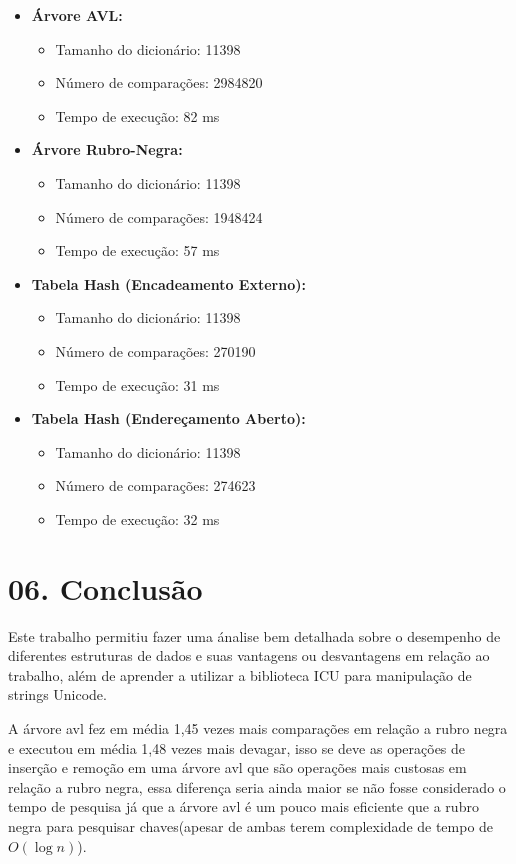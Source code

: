 \documentclass{article}
\begin{document}
\begin{itemize}
    \item \textbf{Árvore AVL:}
    \begin{itemize}
        \item Tamanho do dicionário: 11398
        \item Número de comparações: 2984820
        \item Tempo de execução: 82 ms
    \end{itemize}
    
    \item \textbf{Árvore Rubro-Negra:}
    \begin{itemize}
        \item Tamanho do dicionário: 11398
        \item Número de comparações: 1948424
        \item Tempo de execução: 57 ms
    \end{itemize}
    
    \item \textbf{Tabela Hash (Encadeamento Externo):}
    \begin{itemize}
        \item Tamanho do dicionário: 11398
        \item Número de comparações: 270190
        \item Tempo de execução: 31 ms
    \end{itemize}
    
    \item \textbf{Tabela Hash (Endereçamento Aberto):}
    \begin{itemize}
        \item Tamanho do dicionário: 11398
        \item Número de comparações: 274623
        \item Tempo de execução: 32 ms
    \end{itemize}
\end{itemize}

\section*{06. Conclusão}
Este trabalho permitiu fazer uma ánalise bem detalhada sobre o desempenho de diferentes estruturas de dados e suas vantagens ou desvantagens em relação ao trabalho, além de aprender a utilizar a biblioteca ICU para manipulação de strings Unicode.

A árvore avl fez em média 1,45 vezes mais comparações em relação a rubro negra e executou em média 1,48 vezes mais devagar, isso se deve as operações de inserção e remoção em uma árvore avl que são operações mais custosas em relação a rubro negra, essa diferença seria ainda maior se não fosse considerado o tempo de pesquisa já que a árvore avl é um pouco mais eficiente que a rubro negra para pesquisar chaves(apesar de ambas terem complexidade de tempo de \(\displaystyle O(\log n)\)).
\end{document}
